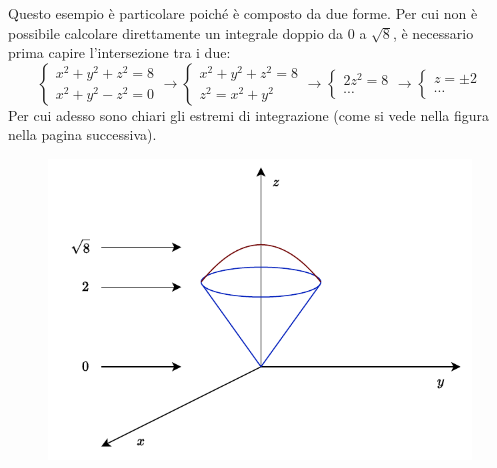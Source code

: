 \documentclass[a4paper]{article}
\begin{document}
	Questo esempio è particolare poiché è composto da due forme. Per cui non è possibile calcolare direttamente un integrale doppio da $0$ a $\sqrt{8}$, è necessario prima capire l'intersezione tra i due:
	\begin{equation*}
		\begin{cases}
			x^{2} + y^{2} + z^{2} = 8 \\
			x^{2} + y^{2} - z^{2} = 0
		\end{cases}
		\rightarrow
		\begin{cases}
			x^{2} + y^{2} + z^{2} = 8 \\
			z^{2} = x^{2} + y^{2}
		\end{cases}
		\rightarrow
		\begin{cases}
			2z^{2} = 8 \\
			\cdots
		\end{cases}
		\rightarrow
		\begin{cases}
			z = \pm 2 \\
			\cdots
		\end{cases}
	\end{equation*}
	Per cui adesso sono chiari gli estremi di integrazione (come si vede nella figura nella pagina successiva).\newpage
	
	\begin{figure}[!htp]
		\centering
		\includegraphics[width=.8\textwidth]{img/integrazione_per_strati_2.pdf}
	\end{figure}
\end{document}

